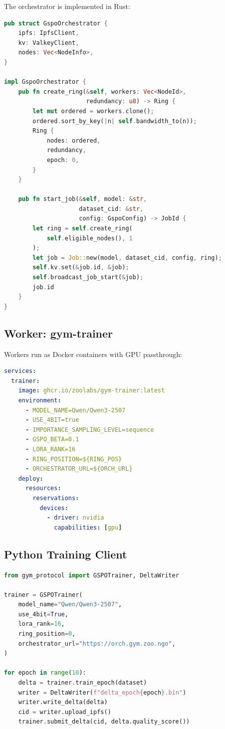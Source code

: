 \documentclass[11pt,letterpaper]{article}
\begin{document}
The orchestrator is implemented in Rust:

\begin{lstlisting}[language=Rust,caption=Ring topology construction (Rust)]
pub struct GspoOrchestrator {
    ipfs: IpfsClient,
    kv: ValkeyClient,
    nodes: Vec<NodeInfo>,
}

impl GspoOrchestrator {
    pub fn create_ring(&self, workers: Vec<NodeId>,
                       redundancy: u8) -> Ring {
        let mut ordered = workers.clone();
        ordered.sort_by_key(|n| self.bandwidth_to(n));
        Ring {
            nodes: ordered,
            redundancy,
            epoch: 0,
        }
    }

    pub fn start_job(&self, model: &str,
                     dataset_cid: &str,
                     config: GspoConfig) -> JobId {
        let ring = self.create_ring(
            self.eligible_nodes(), 1
        );
        let job = Job::new(model, dataset_cid, config, ring);
        self.kv.set(&job.id, &job);
        self.broadcast_job_start(&job);
        job.id
    }
}
\end{lstlisting}

\subsection{Worker: gym-trainer}

Workers run as Docker containers with GPU passthrough:

\begin{lstlisting}[language=YAML,caption=Worker deployment (compose.yml)]
services:
  trainer:
    image: ghcr.io/zoolabs/gym-trainer:latest
    environment:
      - MODEL_NAME=Qwen/Qwen3-2507
      - USE_4BIT=true
      - IMPORTANCE_SAMPLING_LEVEL=sequence
      - GSPO_BETA=0.1
      - LORA_RANK=16
      - RING_POSITION=${RING_POS}
      - ORCHESTRATOR_URL=${ORCH_URL}
    deploy:
      resources:
        reservations:
          devices:
            - driver: nvidia
              capabilities: [gpu]
\end{lstlisting}

\subsection{Python Training Client}

\begin{lstlisting}[language=python,caption=GYM training client]
from gym_protocol import GSPOTrainer, DeltaWriter

trainer = GSPOTrainer(
    model_name="Qwen/Qwen3-2507",
    use_4bit=True,
    lora_rank=16,
    ring_position=0,
    orchestrator_url="https://orch.gym.zoo.ngo",
)

for epoch in range(10):
    delta = trainer.train_epoch(dataset)
    writer = DeltaWriter(f"delta_epoch{epoch}.bin")
    writer.write_delta(delta)
    cid = writer.upload_ipfs()
    trainer.submit_delta(cid, delta.quality_score())
\end{lstlisting}
\end{document}
